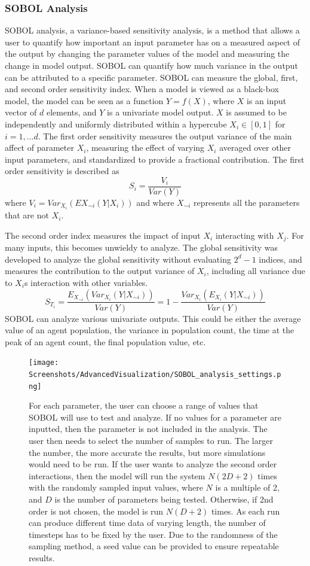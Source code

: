 \subsubsection{SOBOL Analysis}
SOBOL analysis, a variance-based sensitivity analysis, is a method that allows a user to quantify how important an input parameter has on a measured aspect of the output by changing the parameter values  of the model and measuring the change in model output. 
SOBOL can quantify how much variance in the output can be attributed to a specific parameter. 
SOBOL can measure the global, first, and second order sensitivity index. 
When a model is viewed as a black-box model, the model can be seen as a function $Y=f(X)$, where $X$ is an input vector of $d$ elements, and $Y$ is a univariate model output. 
$X$ is assumed to be independently and uniformly distributed within a hypercube $X_i \in [0, 1]$ for $i=1, \dots d$. 
The first order sensitivity measures the output variance of the main affect of parameter $X_i$, measuring the effect of varying $X_i$ averaged over other input parameters, and standardized to provide a fractional contribution. 
The first order sensitivity is described as 
\[
    S_i = \frac{V_i}{Var(Y)}
\] where $V_i = Var_{X_i}(E{X_{\sim i}}(Y|X_i))$ and where $X_{\sim i}$ represents all the parameters that are not $X_i$. 
\newline

The second order index measures the impact of input $X_i$ interacting with $X_j$. For many inputs, this becomes unwieldy to analyze. 
The global sensitivity was developed to analyze the global sensitivity without evaluating $2^d-1$ indices, and measures the contribution to the output variance of $X_i$, including all variance due to $X_i$s interaction with other variables. 
\[
    S_{T_i} = \frac{E_{X_{\sim i}}(Var_{X_i}(Y|X_{\sim i}))}{Var(Y)} = 1 - \frac{Var_{X_i}(E_{X_i}(Y|X_{\sim i}))}{Var(Y)}
\]
SOBOL can analyze various univariate outputs. 
This could be either the average value of an agent population, the variance in population count, the time at the peak of an agent count, the final population value, etc. 
\begin{figure}
    \centering
    \texttt{[image: Screenshots/AdvancedVisualization/SOBOL\_analysis\_settings.png]}
    \caption{
		For each parameter, the user can choose a range of values that SOBOL will use to test and analyze. 
		If no values for a parameter are inputted, then the parameter is not included in the analysis. 
		The user then needs to select the number of samples to run. 
        The larger the number, the more accurate the results, but more simulations would need to be run. 
        If the user wants to analyze the second order interactions, then the model will run the system $N(2D+2)$ times with the randomly sampled input values, where $N$ is a multiple of 2, and $D$ is the number of parameters being tested. 
        Otherwise, if 2nd order is not chosen, the model is run $N(D+2)$ times. 
        As each run can produce different time data of varying length, the number of timesteps has to be fixed by the user. 
        Due to the randomness of the sampling method, a seed value can be provided to ensure repeatable results. 
    }
    \label{fig:ss:av:SOBOL_analysis_settings}
\end{figure}

